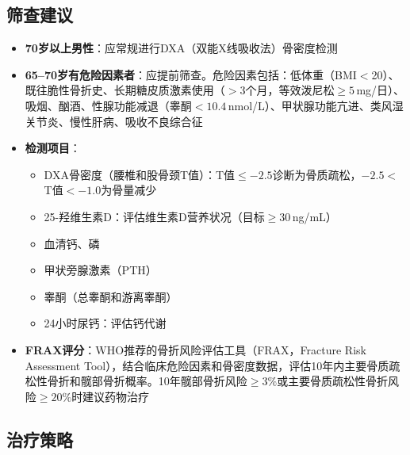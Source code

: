 \subsection{筛查建议}

\begin{itemize}[leftmargin=2cm]
	\item \textbf{70岁以上男性}：应常规进行DXA（双能X线吸收法）骨密度检测
	\item \textbf{65--70岁有危险因素者}：应提前筛查。危险因素包括：低体重（BMI$<$20）、既往脆性骨折史、长期糖皮质激素使用（$>3$个月，等效泼尼松$\geq 5\,$mg/日）、吸烟、酗酒、性腺功能减退（睾酮$<10.4\,$nmol/L）、甲状腺功能亢进、类风湿关节炎、慢性肝病、吸收不良综合征
	\item \textbf{检测项目}：
	\begin{itemize}
		\item DXA骨密度（腰椎和股骨颈T值）：T值$\leq -2.5$诊断为骨质疏松，$-2.5 < $T值$< -1.0$为骨量减少
		\item 25-羟维生素D：评估维生素D营养状况（目标$\geq 30\,$ng/mL）
		\item 血清钙、磷
		\item 甲状旁腺激素（PTH）
		\item 睾酮（总睾酮和游离睾酮）
		\item 24小时尿钙：评估钙代谢
	\end{itemize}
	\item \textbf{FRAX评分}：WHO推荐的骨折风险评估工具（FRAX，Fracture Risk Assessment Tool），结合临床危险因素和骨密度数据，评估10年内主要骨质疏松性骨折和髋部骨折概率。10年髋部骨折风险$\geq 3\%$或主要骨质疏松性骨折风险$\geq 20\%$时建议药物治疗
\end{itemize}

\subsection{治疗策略}

